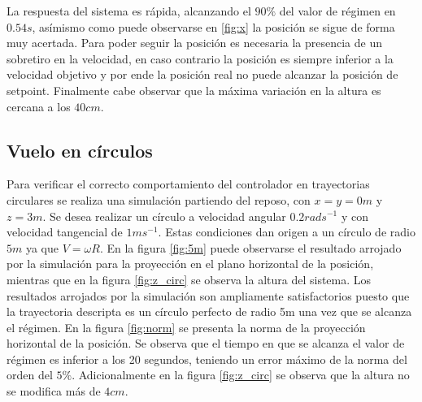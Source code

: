 \documentclass[main]{subfiles}
\begin{document}
La respuesta del sistema es r\'apida, alcanzando el $90\%$ del valor de r\'egimen en $0.54s$, as\'imismo como puede observarse en \ref{fig:x} la posici\'on se sigue de forma muy acertada.  Para poder seguir la posici\'on es necesaria la presencia de un sobretiro en la velocidad, en caso contrario la posici\'on es siempre inferior a la velocidad objetivo y por ende la posici\'on real no puede alcanzar la posici\'on de setpoint. Finalmente cabe observar que la m\'axima variaci\'on en la altura es cercana a los $40cm$.

%
%

\subsection{Vuelo en c\'irculos}
Para verificar el correcto comportamiento del controlador en trayectorias circulares se realiza una simulaci\'on partiendo del reposo, con $x =y = 0m$ y $z=3m$. Se desea realizar un c\'irculo a velocidad angular $0.2rads^{-1}$ y con velocidad tangencial de $1ms^{-1}$. Estas condiciones dan origen a un c\'irculo de radio $5m$ ya que $V = \omega R$. En la figura \ref{fig:5m} puede observarse el resultado arrojado por la simulaci\'on para la proyecci\'on en el plano horizontal de la posici\'on, mientras que en la figura \ref{fig:z_circ} se observa la altura del sistema. Los resultados arrojados por la simulaci\'on son ampliamente satisfactorios puesto que la trayectoria descripta es un c\'irculo perfecto de radio 5m una vez que se alcanza el r\'egimen. En la figura \ref{fig:norm} se presenta la norma de la proyecci\'on horizontal de la posici\'on. Se observa que el tiempo en que se alcanza el valor de r\'egimen es inferior a los 20 segundos, teniendo un error m\'aximo de la norma del orden del $5\%$. Adicionalmente en la figura \ref{fig:z_circ} se observa que la altura no se modifica m\'as de $4cm$.\\
 
\end{document}
